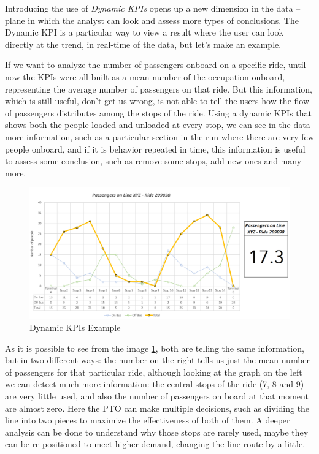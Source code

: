 Introducing the use of \textit{Dynamic KPIs} opens up a new dimension in the data – plane in which the analyst can look and assess more types of conclusions. The Dynamic KPI is a particular way to view a result where the user can look directly at the trend, in real-time of the data, but let’s make an example.

If we want to analyze the number of passengers onboard on a specific ride, until now the KPIs were all built as a mean number of the occupation onboard, representing the average number of passengers on that ride. But this information, which is still useful, don’t get us wrong, is not able to tell the users how the flow of passengers distributes among the stops of the ride. Using a dynamic KPIs that shows both the people loaded and unloaded at every stop, we can see in the data more information, such as a particular section in the run where there are very few people onboard, and if it is behavior repeated in time, this information is useful to assess some conclusion, such as remove some stops, add new ones and many more.

\begin{figure}[t]
    \centering
    \includegraphics[width=1\textwidth]{Images/New Technologies/dynamic KPIs.png}
    \caption{Dynamic KPIs Example}
    \label{fig:dynKPI}
\end{figure}

As it is possible to see from the image  \ref{fig:dynKPI}, both are telling the same information, but in two different ways: the number on the right tells us just the mean number of passengers for that particular ride, although looking at the graph on the left we can detect much more information: the central stops of the ride (7, 8 and 9) are very little used, and also the number of passengers on board at that moment are almost zero. Here the PTO can make multiple decisions, such as dividing the line into two pieces to maximize the effectiveness of both of them. A deeper analysis can be done to understand why those stops are rarely used, maybe they can be re-positioned to meet higher demand, changing the line route by a little.




